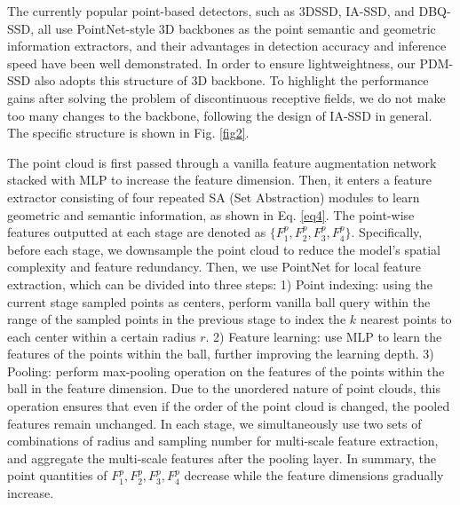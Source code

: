 The currently popular point-based detectors, such as 3DSSD, IA-SSD, and DBQ-SSD, all use PointNet-style 3D backbones as the point semantic and geometric information extractors, and their advantages in detection accuracy and inference speed have been well demonstrated. In order to ensure lightweightness, our PDM-SSD also adopts this structure of 3D backbone. To highlight the performance gains after solving the problem of discontinuous receptive fields, we do not make too many changes to the backbone, following the design of IA-SSD in general. The specific structure is shown in Fig. \ref{fig2}.

The point cloud is first passed through a vanilla feature augmentation network stacked with MLP to increase the feature dimension. Then, it enters a feature extractor consisting of four repeated SA (Set Abstraction) modules to learn geometric and semantic information, as shown in Eq. \ref{eq4}. The point-wise features outputted at each stage are denoted as $\{F^p_{1}, F^p_{2}, F^p_{3}, F^p_{4}\}$. Specifically, before each stage, we downsample the point cloud to reduce the model's spatial complexity and feature redundancy. Then, we use PointNet for local feature extraction, which can be divided into three steps: 1) Point indexing: using the current stage sampled points as centers, perform vanilla ball query within the range of the sampled points in the previous stage to index the $k$ nearest points to each center within a certain radius $r$. 2) Feature learning: use MLP to learn the features of the points within the ball, further improving the learning depth. 3) Pooling: perform max-pooling operation on the features of the points within the ball in the feature dimension. Due to the unordered nature of point clouds, this operation ensures that even if the order of the point cloud is changed, the pooled features remain unchanged. In each stage, we simultaneously use two sets of combinations of radius and sampling number for multi-scale feature extraction, and aggregate the multi-scale features after the pooling layer. In summary, the point quantities of $F^p_{1}, F^p_{2}, F^p_{3}, F^p_{4}$ decrease while the feature dimensions gradually increase.

